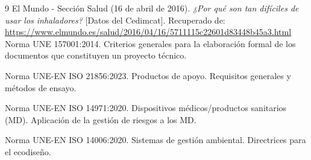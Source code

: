 \documentclass[11pt,a4paper]{article}
\begin{document}
\renewcommand{\refname}{9. BIBLIOGRAFÍA Y NORMATIVA TÉCNICA}

\begin{thebibliography}{9}
    El Mundo - Sección Salud (16 de abril de 2016). \textit{¿Por qué son tan difíciles de usar los inhaladores?} [Datos del Cedimcat]. Recuperado de: \url{https://www.elmundo.es/salud/2016/04/16/5711115c22601d83448b45a3.html}
    Norma UNE 157001:2014. Criterios generales para la elaboración formal de los documentos que constituyen un proyecto técnico.

    Norma UNE-EN ISO 21856:2023. Productos de apoyo. Requisitos generales y métodos de ensayo.

Norma UNE-EN ISO 14971:2020. Dispositivos médicos/productos sanitarios (MD). Aplicación de la gestión de riesgos a los MD.

    Norma UNE-EN ISO 14006:2020. Sistemas de gestión ambiental. Directrices para el ecodiseño.
\end{thebibliography}
\end{document}
